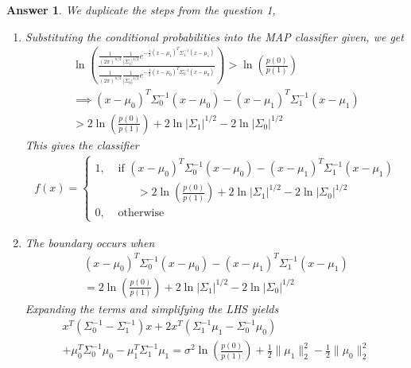\documentclass[12pt]{article}
\theoremstyle{colon}
\newtheorem*{answer}{Answer}
\begin{document}
\begin{answer}
  We duplicate the steps from the question 1,
  \begin{enumerate}[label=\alph*)]
    \item Substituting the conditional probabilities into the MAP classifier given, we get
      \begin{gather*}
        \ln \left(\frac{\frac{1}{(2 \pi)^{n/2}} \frac{1}{\lvert \Sigma_1 \rvert^{1/2}} e^{-\frac{1}{2} (x - \mu_1)^T \Sigma_1^{-1} (x - \mu_1)}}{\frac{1}{(2 \pi)^{n/2}} \frac{1}{\lvert \Sigma_0 \rvert^{1/2}} e^{-\frac{1}{2} (x - \mu_0)^T \Sigma_0^{-1} (x - \mu_0)}} \right) > \ln \left( \frac{p(0)}{p(1)} \right) \\
        \implies (x - \mu_0)^T \Sigma_0^{-1} (x - \mu_0) - (x - \mu_1)^T \Sigma_1^{-1} (x - \mu_1) \\
        > 2 \ln \left( \frac{p(0)}{p(1)} \right) + 2 \ln \lvert \Sigma_1 \rvert^{1/2} - 2 \ln \lvert \Sigma_0 \rvert^{1/2}
      \end{gather*}
      This gives the classifier
      \begin{gather*}
        f(x) = \begin{cases}
          1, &\text{ if } (x - \mu_0)^T \Sigma_0^{-1} (x - \mu_0) - (x - \mu_1)^T \Sigma_1^{-1} (x - \mu_1) \\
          &\quad\quad > 2 \ln \left( \frac{p(0)}{p(1)} \right) + 2 \ln \lvert \Sigma_1 \rvert^{1/2} - 2 \ln \lvert \Sigma_0 \rvert^{1/2} \\
          0, &\text{ otherwise}
        \end{cases}
      \end{gather*}
    \item The boundary occurs when
      \begin{gather*}
        (x - \mu_0)^T \Sigma_0^{-1} (x - \mu_0) - (x - \mu_1)^T \Sigma_1^{-1} (x - \mu_1) \\
        = 2 \ln \left( \frac{p(0)}{p(1)} \right) + 2 \ln \lvert \Sigma_1 \rvert^{1/2} - 2 \ln \lvert \Sigma_0 \rvert^{1/2}
      \end{gather*}
      Expanding the terms and simplifying the LHS yields
      \begin{gather*}
        x^T \left( \Sigma_0^{-1} - \Sigma_1^{-1} \right)x + 2x^T (\Sigma_1^{-1} \mu_1 - \Sigma_0^{-1} \mu_0) \\
        + \mu_0^T \Sigma_0^{-1} \mu_0 - \mu_1^T \Sigma_1^{-1} \mu_1 = \sigma^2 \ln \left( \frac{p(0)}{p(1)} \right) + \frac{1}{2} \lVert \mu_1 \rVert_2^2 -  \frac{1}{2} \lVert \mu_0 \rVert_2^2
      \end{gather*}


\end{enumerate}
\end{answer}
\end{document}
